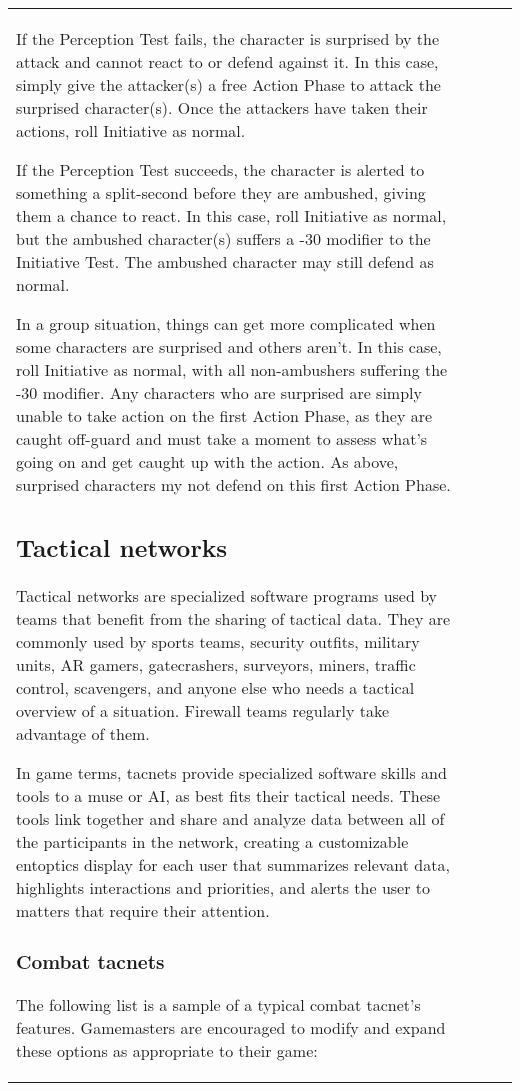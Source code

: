 \begin{table}
\begin{tabular}{|p{8cm}|r|r|r|}
If the Perception Test fails, the character is surprised by the attack and cannot react to or defend against it. In this case, simply give the attacker(s) a free Action Phase to attack the surprised character(s). Once the attackers have taken their actions, roll Initiative as normal. 

If the Perception Test succeeds, the character is alerted to something a split-second before they are ambushed, giving them a chance to react. In this case, roll Initiative as normal, but the ambushed character(s) suffers a -30 modifier to the Initiative Test. The ambushed character may still defend as normal. 

In a group situation, things can get more complicated when some characters are surprised and others aren’t. In this case, roll Initiative as normal, with all non-ambushers suffering the -30 modifier. Any characters who are surprised are simply unable to take action on the first Action Phase, as they are caught off-guard and must take a moment to assess what’s going on and get caught up with the action. As above, surprised characters my not defend on this first Action Phase. 



\subsection{Tactical networks} \label{sec:tactical-networks} 

Tactical networks are specialized software programs used by teams that benefit from the sharing of tactical data. They are commonly used by sports teams, security outfits, military units, AR gamers, gatecrashers, surveyors, miners, traffic control, scavengers, and anyone else who needs a tactical overview of a situation. Firewall teams regularly take advantage of them. 

In game terms, tacnets provide specialized software skills and tools to a muse or AI, as best fits their tactical needs. These tools link together and share and analyze data between all of the participants in the network, creating a customizable entoptics display for each user that summarizes relevant data, highlights interactions and priorities, and alerts the user to matters that require their attention. 

\subsubsection{Combat tacnets} The following list is a sample of a typical combat tacnet’s features. Gamemasters are encouraged to modify and expand these options as appropriate to their game: 


\end{tabular}
\end{table}
